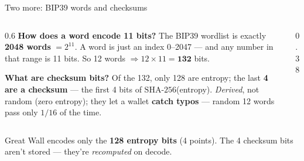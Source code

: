 \documentclass[aspectratio=169,11pt]{beamer}
\begin{document}
\begin{frame}{Two more: BIP39 words and checksums}
  \begin{columns}[T]
    \begin{column}{0.6\textwidth}
      \small
      \textbf{How does a word encode 11 bits?} The BIP39 wordlist is exactly
      \textbf{2048 words} $=2^{11}$. A word is just an index 0--2047 --- and any
      number in that range is 11 bits. So 12 words $\Rightarrow 12\times11 =
      \textbf{132}$ bits.
      \vspace{6pt}

      \textbf{What are checksum bits?} Of the 132, only 128 are entropy; the last
      \textbf{4 are a checksum} --- the first 4 bits of
      $\mathrm{SHA\text{-}256}$(entropy). \emph{Derived}, not random (zero
      entropy); they let a wallet \textbf{catch typos} --- random 12 words pass
      only $1/16$ of the time.
    \end{column}
    \begin{column}{0.38\textwidth}
      \centering
      \vspace{10pt}
    \end{column}
  \end{columns}
  \vspace{10pt}
  \begin{center}\footnotesize\color{graytext}
  Great Wall encodes only the \textbf{128 entropy bits} (4 points). The 4 checksum
  bits aren't stored --- they're \emph{recomputed} on decode.
  \end{center}
\end{frame}
\end{document}
